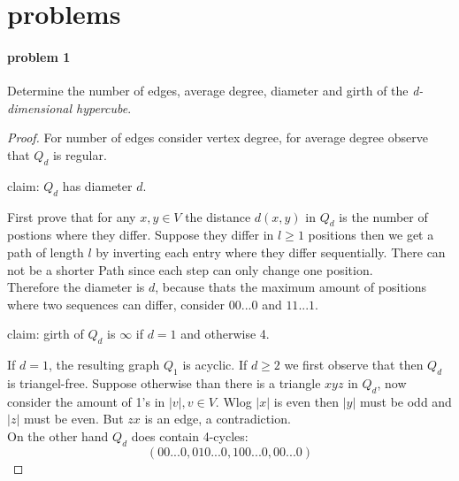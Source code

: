 \section{problems}

\paragraph{problem 1}
Determine the number of edges, average degree, diameter and girth of the 
\textit{d-dimensional hypercube}.
\begin{proof}
    For number of edges consider vertex degree, for average degree observe that $ Q_d $ 
    is regular.

    \bigskip
    \noindent claim: $ Q_d $ has diameter $ d $.

    \smallskip
    \noindent First prove that for any $ x,y \in V $ the distance $ d(x,y) $ in $ Q_d $ is 
    the number of postions where they differ. Suppose they differ in $ l \geq 1 $ 
    positions then we get a path of length $ l $ by inverting each entry where they 
    differ sequentially. There can not be a shorter Path since each step 
    can only change one position. \\
    Therefore the diameter is $ d $, because thats the maximum amount of positions 
    where two sequences can differ, consider $ 00...0 $ and $ 11...1 $.

    \bigskip
    \noindent claim: girth of $ Q_d $ is $ \infty $ if $ d = 1 $ and otherwise 4.

    \smallskip
    \noindent
    If $ d = 1 $, the resulting graph $ Q_1 $ is acyclic. If $ d \geq 2 $ we first 
    observe that then $ Q_d $ is triangel-free. Suppose otherwise than there is 
    a triangle $ xyz $ in $ Q_d $, now consider the amount of 1's in $ |v|, v \in V $.
    Wlog $ |x| $ is even then $ |y| $ must be odd and $ |z| $ must be even.
    But $ zx $ is an edge, a contradiction. \\
    On the other hand $ Q_d $ does contain 4-cycles:
    $$ (00...0, 010...0, 100...0, 00...0)$$
\end{proof}

